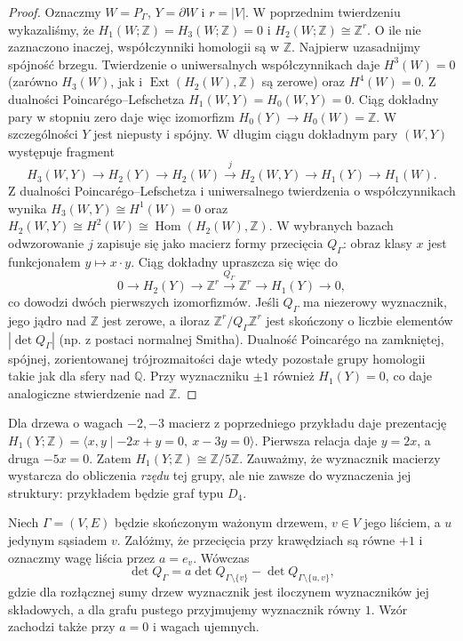 \begin{proof}
Oznaczmy $W=P_\Gamma$, $Y=\partial W$ i $r=|V|$.
W poprzednim twierdzeniu wykazaliśmy, że
$H_1(W;\mathbb Z)=H_3(W;\mathbb Z)=0$
i $H_2(W;\mathbb Z)\cong\mathbb Z^r$.
O ile nie zaznaczono inaczej, współczynniki
homologii są w $\mathbb Z$.
Najpierw uzasadnijmy spójność brzegu.
Twierdzenie o uniwersalnych współczynnikach
daje $H^3(W)=0$ (zarówno $H_3(W)$,
jak i $\operatorname{Ext}(H_2(W),\mathbb Z)$
są zerowe) oraz $H^4(W)=0$.
Z dualności Poincarégo--Lefschetza
$H_1(W,Y)=H_0(W,Y)=0$.
Ciąg dokładny pary w stopniu zero daje więc
izomorfizm $H_0(Y)\to H_0(W)=\mathbb Z$.
W szczególności $Y$ jest niepusty i spójny.
W długim ciągu dokładnym pary $(W,Y)$ występuje fragment
\[
H_3(W,Y)\longrightarrow H_2(Y)\longrightarrow H_2(W)
\xrightarrow{\ j\ }H_2(W,Y)\longrightarrow H_1(Y)
\longrightarrow H_1(W).
\]
Z dualności Poincarégo--Lefschetza i uniwersalnego twierdzenia
o współczynnikach wynika
$H_3(W,Y)\cong H^1(W)=0$ oraz
$H_2(W,Y)\cong H^2(W)\cong\operatorname{Hom}(H_2(W),\mathbb Z)$.
W wybranych bazach odwzorowanie $j$ zapisuje się jako macierz
formy przecięcia $Q_\Gamma$: obraz klasy $x$ jest funkcjonałem
$y\mapsto x\cdot y$. Ciąg dokładny upraszcza się więc do
\[
0\longrightarrow H_2(Y)\longrightarrow\mathbb Z^r
\xrightarrow{Q_\Gamma}\mathbb Z^r
\longrightarrow H_1(Y)\longrightarrow0,
\]
co dowodzi dwóch pierwszych izomorfizmów. Jeśli $Q_\Gamma$
ma niezerowy wyznacznik, jego jądro nad $\mathbb Z$ jest zerowe,
a iloraz $\mathbb Z^r/Q_\Gamma\mathbb Z^r$ jest skończony
o liczbie elementów $|\det Q_\Gamma|$ (np. z postaci normalnej
Smitha). Dualność Poincarégo na zamkniętej, spójnej,
zorientowanej trójrozmaitości daje wtedy pozostałe grupy
homologii takie jak dla sfery nad $\mathbb Q$.
Przy wyznaczniku $\pm1$ również $H_1(Y)=0$, co daje
analogiczne stwierdzenie nad $\mathbb Z$.
\end{proof}

\begin{przyklad}
Dla drzewa o wagach $-2,-3$ macierz z poprzedniego
przykładu daje prezentację
$H_1(Y;\mathbb Z)=\langle x,y\mid -2x+y=0,\ x-3y=0\rangle$.
Pierwsza relacja daje $y=2x$, a druga $-5x=0$.
Zatem $H_1(Y;\mathbb Z)\cong\mathbb Z/5\mathbb Z$.
Zauważmy, że wyznacznik macierzy wystarcza do obliczenia
\emph{rzędu} tej grupy, ale nie zawsze do wyznaczenia
jej struktury: przykładem będzie graf typu $D_4$.
\end{przyklad}

\begin{lemat}
\label{lem:tg-plumbing-leaf-determinant}
Niech $\Gamma=(V,E)$ będzie skończonym ważonym drzewem,
$v\in V$ jego liściem, a $u$ jedynym sąsiadem $v$.
Załóżmy, że przecięcia przy krawędziach są równe $+1$
i oznaczmy wagę liścia przez $a=e_v$.
Wówczas
\[
\det Q_\Gamma
=a\det Q_{\Gamma\setminus\{v\}}
-\det Q_{\Gamma\setminus\{u,v\}},
\]
gdzie dla rozłącznej sumy drzew wyznacznik
jest iloczynem wyznaczników jej składowych,
a dla grafu pustego przyjmujemy wyznacznik równy $1$.
Wzór zachodzi także przy $a=0$ i wagach ujemnych.
\end{lemat}

